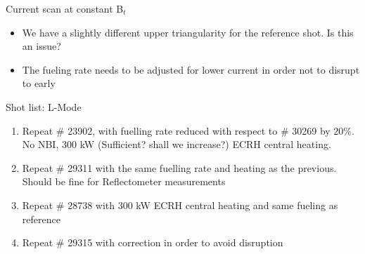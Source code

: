 \documentclass[10pt, compress]{beamer}
\newcommand\Fontvi{\fontsize{8}{7.2}\selectfont}
\begin{document}
\begin{frame}{Current scan at constant B$_t$}
  \Fontvi
  \begin{itemize}
    \item We have a slightly different upper triangularity for the
      reference shot. \alert{Is this an issue?}
    \item The fueling rate needs to be adjusted for lower current in
      order not to disrupt to early
  \end{itemize}    
\end{frame}


\begin{frame}{Shot list: L-Mode}
  \begin{enumerate}
    \item Repeat \# 23902, with fuelling rate reduced with respect to
      \# 30269 by 20\%. No NBI, 300 kW (\alert{Sufficient? shall we increase?}) ECRH central heating.
    \item Repeat \# 29311 with the same fuelling rate and heating as
      the previous. Should be fine for Reflectometer measurements
    \item Repeat \# 28738 with 300 kW ECRH central heating and same
      fueling as reference
    \item Repeat \# 29315 with correction in order to avoid disruption
  \end{enumerate}
  \end{frame}
\end{document}

